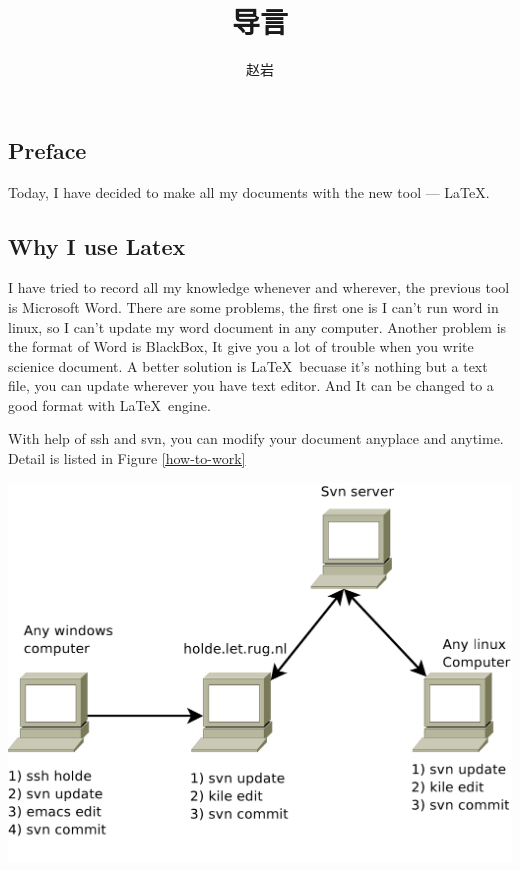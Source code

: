 \documentclass[a4paper,12pt,twoside]{book}
\begin{document}
\begin{CJK*}{UTF8}{song}
\title{导言}
\author{赵岩}
\date{}\maketitle


\else
\chapter{Preface}
\fi

Today, I have decided to make all my documents with the new tool --- \LaTeX.
\section*{Why I use Latex}
I have tried to record all my knowledge whenever and wherever, the previous tool is Microsoft Word. There are some problems, the first one is I can't run word in linux, so I can't update my word document in any computer. Another problem is the format of Word is BlackBox, It give you a lot of trouble when you write scienice document. A better solution is \LaTeX\ becuase it's nothing but a text file, you can update wherever you have text editor. And It can be changed to a good format with \LaTeX\ engine. \par

With help of ssh and svn, you can modify your document anyplace and anytime. Detail is listed in Figure  \ref{how-to-work}\\
\begin{center}
\includegraphics[scale=0.4]{pics/Doc_develop}
\label{how-to-work}
\end{center}

\end{CJK*}
\end{document}
